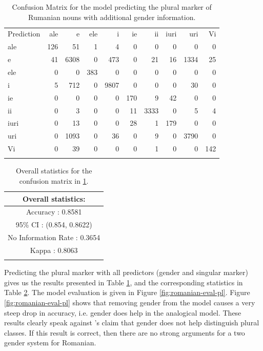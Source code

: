 \begin{table}[!htpb]
  \centering
  \begin{tabular}{lrrrrrrrrr}
    \lsptoprule
    \multicolumn{10}{c}{Reference}                                        \\
    \midrule
    Prediction & ale & e    & ele & i    & ie  & ii   & iuri & uri  & Vi  \\
    ale        & 126 & 51   & 1   & 4    & 0   & 0    & 0    & 0    & 0   \\
    e          & 41  & 6308 & 0   & 473  & 0   & 21   & 16   & 1334 & 25  \\
    ele        & 0   & 0    & 383 & 0    & 0   & 0    & 0    & 0    & 0   \\
    i          & 5   & 712  & 0   & 9807 & 0   & 0    & 0    & 30   & 0   \\
    ie         & 0   & 0    & 0   & 0    & 170 & 9    & 42   & 0    & 0   \\
    ii         & 0   & 3    & 0   & 0    & 11  & 3333 & 0    & 5    & 4   \\
    iuri       & 0   & 13   & 0   & 0    & 28  & 1    & 179  & 0    & 0   \\
    uri        & 0   & 1093 & 0   & 36   & 0   & 9    & 0    & 3790 & 0   \\
    Vi         & 0   & 39   & 0   & 0    & 0   & 1    & 0    & 0    & 142 \\
    \lspbottomrule
  \end{tabular}
  \caption{Confusion Matrix for the model predicting the plural marker of Rumanian nouns with additional gender information.}
  \label{tab:plural-romanian-2}
\end{table}

\begin{table}[!htpb]
  \centering
  \begin{tabular}{c}
    \lsptoprule
    Overall statistics: \\
    \midrule
    Accuracy : 0.8581\\
    95\% CI : (0.854, 0.8622)\\
    No Information Rate : 0.3654\\
    Kappa : 0.8063\\
    \lspbottomrule
  \end{tabular}
  \caption{Overall statistics for the confusion matrix in \ref{tab:plural-romanian-2}.}\label{tab:plural-romanian-stats-2}
\end{table}

Predicting the plural marker with all predictors (gender and singular marker) gives us the results presented in Table \ref{tab:plural-romanian-2}, and the corresponding statistics in Table \ref{tab:plural-romanian-stats-2}. The model evaluation is given in Figure \ref{fig:romanian-eval-pl}. Figure \ref{fig:romanian-eval-pl} shows that removing gender from the model causes a very steep drop in accuracy, i.e. gender does help in the analogical model. These results clearly speak against \textcite{Bateman.2010}'s claim that gender does not help distinguish plural classes. If this result is correct, then there are no strong arguments for a two gender system for Romanian.

